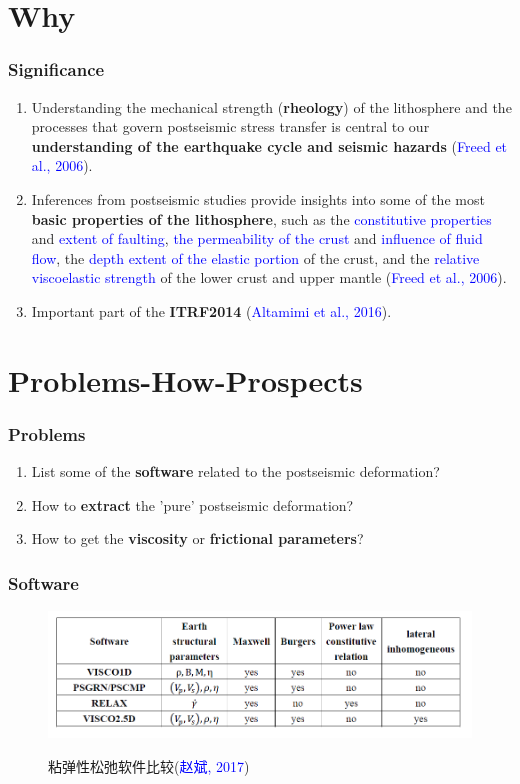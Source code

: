 ﻿\documentclass{beamer}
\begin{document}
\section{Why}
\begin{frame}
\frametitle{Significance}
\begin{enumerate}
  \item Understanding the mechanical strength (\textbf{rheology}) of the lithosphere and the processes that govern postseismic stress transfer is central to our \textbf{understanding of the earthquake cycle and seismic hazards} (\textcolor{blue}{Freed et al., 2006}).
  \item Inferences from postseismic studies provide insights into some of the most \textbf{basic properties of the lithosphere}, such as the \textcolor{blue}{constitutive properties} and \textcolor{blue}{extent of faulting}, \textcolor{blue}{the permeability of the crust} and \textcolor{blue}{influence of fluid flow}, the \textcolor{blue}{depth extent of the elastic portion} of the crust, and the \textcolor{blue}{relative viscoelastic strength} of the lower crust and upper mantle (\textcolor{blue}{Freed et al., 2006}).
  \item Important part of the \textbf{ITRF2014} (\textcolor{blue}{Altamimi et al., 2016}).
\end{enumerate}

\end{frame}
\section{Problems-How-Prospects}
\begin{frame}
\frametitle{Problems}

\begin{enumerate}
  \item List some of the \textbf{software} related to the postseismic deformation?
  \item How to \textbf{extract} the 'pure' postseismic deformation?
  \item How to get the \textbf{viscosity} or \textbf{frictional parameters}?
\end{enumerate}

\end{frame}

\begin{frame}
\frametitle{Software}
\begin{figure}
  \centering
  \includegraphics[scale=0.4]{./pic/soft11.png}\\
  \caption{粘弹性松弛软件比较(\textcolor{blue}{赵斌, 2017})}\label{fig_okada}
\end{figure}

\end{frame}
\end{document}
